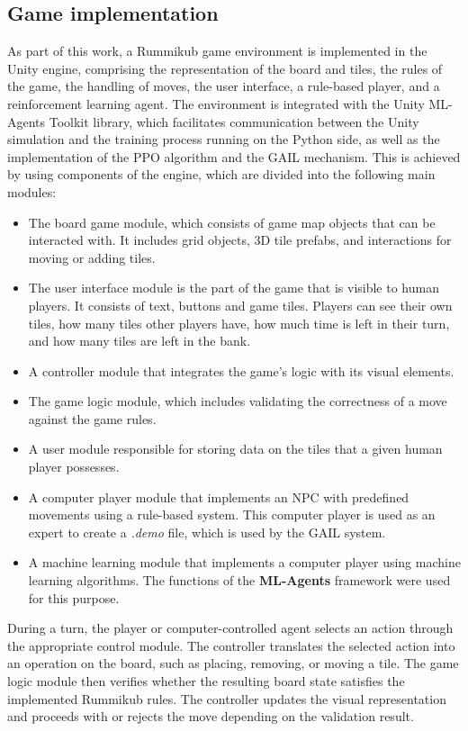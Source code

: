  \subsection{Game implementation}
 As part of this work, a Rummikub game environment is implemented in the Unity engine, comprising the representation of the board and tiles, the rules of the game, the handling of moves, the user interface, a rule-based player, and a reinforcement learning agent. The environment is integrated with the Unity ML-Agents Toolkit library, which facilitates communication between the Unity simulation and the training process running on the Python side, as well as the implementation of the PPO algorithm and the GAIL mechanism.
This is achieved by using components of the engine, which are divided into the following main modules:
 \begin{itemize}
 	\item The board game module, which consists of game map objects that can be interacted with. It includes grid objects, 3D tile prefabs, and interactions for moving or adding tiles.
 	\item  The user interface module is the part of the game that is visible to human players. It consists of text, buttons and game tiles. Players can see their own tiles, how many tiles other players have, how much time is left in their turn, and how many tiles are left in the bank.
 	\item A controller module that integrates the game's logic with its visual elements.
 	\item The game logic module, which includes validating the correctness of a move against the game rules.
 	\item A user module responsible for storing data on the tiles that a given human player possesses.
 	\item A computer player module that implements an NPC with predefined movements using a rule-based system. This computer player is used as an expert to create a \textit{.demo} file, which is used by the GAIL system.
 	\item A machine learning module that implements a computer player using machine learning algorithms. The functions of the \textbf{ML-Agents} framework were used for this purpose.  
 \end{itemize}
 During a turn, the player or computer-controlled agent selects an action through the appropriate control module. The controller translates the selected action into an operation on the board, such as placing, removing, or moving a tile. The game logic module then verifies whether the resulting board state satisfies the implemented Rummikub rules. The controller updates the visual representation and proceeds with or rejects the move depending on the validation result.
 
